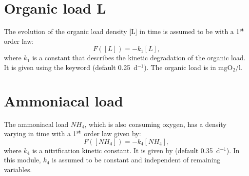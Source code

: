 \section{Organic load L}

The evolution of the organic load density [L] in time is assumed
to be with a 1$^{\rm{st}}$ order law:
\begin{equation*}
 F([L]) = -k_1 [L],
\end{equation*}
where $k_1$ is a constant that describes the kinetic degradation of the organic load.
It is given using the keyword 
(default 0.25~d$^{-1}$).
The organic load is in mgO$_2$/l.


\section{Ammoniacal load}

The ammoniacal load $NH_4$, which is also consuming oxygen,
has a density varying in time with a 1$^{\rm{st}}$ order law given by:
\begin{equation*}
 F([NH_4]) = -k_4 [NH_4],
\end{equation*}
where $k_4$ is a nitrification kinetic constant.
It is given by  (default 0.35~d$^{-1}$).
In this module, $k_4$ is assumed to be constant and independent of remaining variables.



